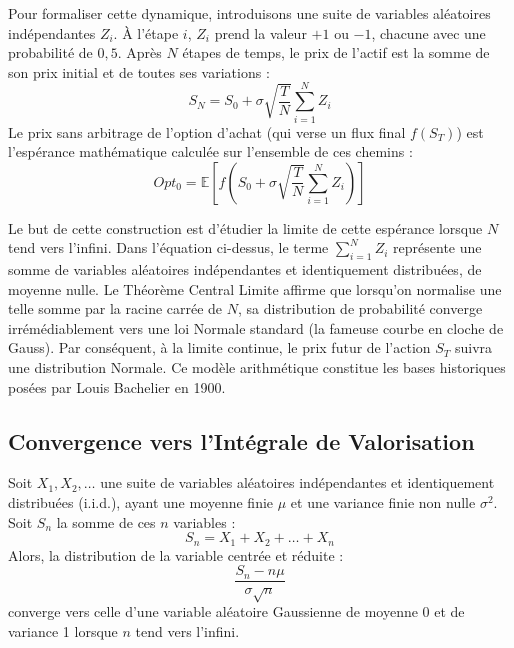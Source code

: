 Pour formaliser cette dynamique, introduisons une suite de variables aléatoires indépendantes $Z_i$. À l'étape $i$, $Z_i$ prend la valeur $+1$ ou $-1$, chacune avec une probabilité de $0,5$. Après $N$ étapes de temps, le prix de l'actif est la somme de son prix initial et de toutes ses variations :
\begin{equation}
    \label{eq:fsec3-prix_sn_discret}
    S_N = S_0 + \sigma \sqrt{\frac{T}{N}} \sum_{i=1}^{N} Z_i
\end{equation}
Le prix sans arbitrage de l'option d'achat (qui verse un flux final $f(S_T)$) est l'espérance mathématique calculée sur l'ensemble de ces chemins :
\begin{equation}
    \label{eq:fsec3-opt_sn_discret}
    Opt_0 = \mathbb{E}\left[ f\left( S_0 + \sigma \sqrt{\frac{T}{N}} \sum_{i=1}^{N} Z_i \right) \right]
\end{equation}

Le but de cette construction est d'étudier la limite de cette espérance lorsque $N$ tend vers l'infini. Dans l'équation ci-dessus, le terme $\sum_{i=1}^{N} Z_i$ représente une somme de variables aléatoires indépendantes et identiquement distribuées, de moyenne nulle. Le Théorème Central Limite affirme que lorsqu'on normalise une telle somme par la racine carrée de $N$, sa distribution de probabilité converge irrémédiablement vers une loi Normale standard (la fameuse courbe en cloche de Gauss). Par conséquent, à la limite continue, le prix futur de l'action $S_T$ suivra une distribution Normale. Ce modèle arithmétique constitue les bases historiques posées par Louis Bachelier en 1900.

\subsection{Convergence vers l'Intégrale de Valorisation}

\begin{theorembox}
Soit $X_1, X_2, \dots$ une suite de variables aléatoires indépendantes et identiquement distribuées (i.i.d.), ayant une moyenne finie $\mu$ et une variance finie non nulle $\sigma^2$.
Soit $S_n$ la somme de ces $n$ variables :
\begin{equation}
    \label{eq:fsec3-tcl_somme}
    S_n = X_1 + X_2 + \dots + X_n
\end{equation}
Alors, la distribution de la variable centrée et réduite :
\begin{equation}
    \label{eq:fsec3-tcl_normale}
    \frac{S_n - n\mu}{\sigma \sqrt{n}}
\end{equation}
converge vers celle d'une variable aléatoire Gaussienne de moyenne 0 et de variance 1 lorsque $n$ tend vers l'infini.
\end{theorembox}

